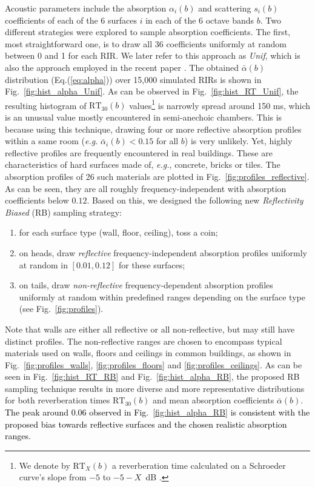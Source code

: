 \documentclass[reprint]{JASA}
\begin{document}
Acoustic parameters include the absorption $\alpha_{i}(b)$ and scattering $s_{i}(b)$ coefficients of each of the 6 surfaces $i$ in each of the 6 octave bands $b$. Two different strategies were explored to sample absorption coefficients. The first, most straightforward one, is to draw all 36 coefficients uniformly at random between 0 and 1 for each RIR. We later refer to this approach as \textit{Unif}, which is also the approach employed in the recent paper \cite{yu2020room}. The obtained $\bar{\alpha}(b)$ distribution (Eq.(\ref{eq:alpha})) over 15,000 simulated RIRs is shown in Fig.~\ref{fig:hist_alpha_Unif}. As can be observed in Fig.~\ref{fig:hist_RT_Unif}, the resulting histogram of $\textrm{RT}_{30}(b)$ values\footnote{We denote by $\textrm{RT}_{X}(b)$ a reverberation time calculated on a Schroeder curve's slope from $-5$ to $ -5-X$~dB \cite{Schroeder:65}.} is narrowly spread around 150 ms, which is an unusual value mostly encountered in semi-anechoic chambers. This is because using this technique, drawing four or more reflective absorption profiles within a same room (\textit{e.g.} $\bar{\alpha}_i(b)<0.15$ for all $b$) is very unlikely. Yet, highly reflective profiles are frequently encountered in real buildings. These are characteristics of hard surfaces made of, \textit{e.g.}, concrete, bricks or tiles. The absorption profiles of 26 such materials are plotted in Fig.~\ref{fig:profiles_reflective}. As can be seen, they are all roughly frequency-independent with absorption coefficients below $0.12$. 
Based on this, we designed the following new \textit{Reflectivity Biased} (RB) sampling strategy:
\begin{enumerate}
	\item for each surface type (wall, floor, ceiling), toss a coin;
	\item on heads, draw \textit{reflective} frequency-independent absorption profiles uniformly at random in $[0.01, 0.12]$ for these surfaces;
	\item on tails, draw \textit{non-reflective} frequency-dependent absorption profiles uniformly at random within predefined ranges depending on the surface type (see Fig.~\ref{fig:profiles}).
\end{enumerate}

Note that walls are either all reflective or all non-reflective, but may still have distinct profiles.
The non-reflective ranges are chosen to encompass typical materials used on walls, floors and ceilings in common buildings, as shown in Fig.~\ref{fig:profiles_walls}, \ref{fig:profiles_floors} and \ref{fig:profiles_ceilings}.
As can be seen in Fig.~\ref{fig:hist_RT_RB} and Fig.~\ref{fig:hist_alpha_RB}, the proposed RB sampling technique results in more diverse and more representative distributions for both reverberation  times $\textrm{RT}_{30}(b)$ and mean absorption coefficients $\bar{\alpha}(b)$. \textcolor{black}{The peak around 0.06 observed in Fig.~\ref{fig:hist_alpha_RB} is consistent with the proposed bias towards reflective surfaces and the chosen realistic absorption ranges.}
\end{document}
